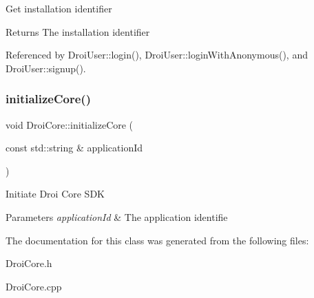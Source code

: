 Get installation identifier \begin{DoxyReturn}{Returns}
The installation identifier 
\end{DoxyReturn}


Referenced by Droi\+User\+::login(), Droi\+User\+::login\+With\+Anonymous(), and Droi\+User\+::signup().

\mbox{\label{class_droi_core_a0e6c7e11c6c4985dfc472aa1f29fa9cd}} 
\subsubsection{\texorpdfstring{initialize\+Core()}{initializeCore()}}
{\footnotesize\ttfamily void Droi\+Core\+::initialize\+Core (\begin{DoxyParamCaption}\item[{const std\+::string \&}]{application\+Id }\end{DoxyParamCaption})\hspace{0.3cm}{\ttfamily [static]}}

Initiate Droi Core S\+DK 
\begin{DoxyParams}{Parameters}
{\em application\+Id} & The application identifie \\
\hline
\end{DoxyParams}


The documentation for this class was generated from the following files\+:\begin{DoxyCompactItemize}
\item 
Droi\+Core.\+h\item 
Droi\+Core.\+cpp\end{DoxyCompactItemize}
